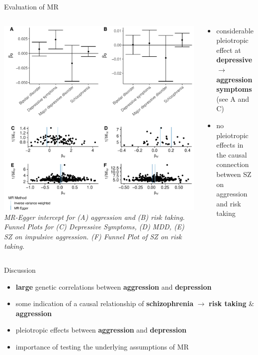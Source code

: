 \documentclass{beamer}
\begin{document}
\begin{frame}[t]{Evaluation of MR}
  \tiny
  \begin{columns}[T]
    \begin{column}[T]{0.6\textwidth}
      \includegraphics[width=0.99\linewidth]{../ukb_psychiatric/figures/sensitvity_plot.pdf}
      \vfill
      \textit{MR-Egger intercept for (A) aggression and (B) risk taking. Funnel Plots for (C) Depressive Symptoms, (D) MDD, (E) SZ on impulsive aggression. (F) Funnel Plot of SZ on risk taking.}
    \end{column}
    \begin{column}[T]{0.4\textwidth}
      \begin{itemize}
        \item considerable pleiotropic effect at \textbf{depressive $\rightarrow$ aggression symptoms} (see A and C)
        \item no pleiotropic effects in the causal connection between SZ on aggression and risk taking 
      \end{itemize}
    \end{column}
  \end{columns}
\end{frame}

\begin{frame}[t]{Discussion}
  \begin{itemize}
    \item \textbf{large} genetic correlations between \textbf{aggression} and \textbf{depression}
    \item some indication of a causal relationship of \textbf{schizophrenia} $\rightarrow$ \textbf{risk taking} \& \textbf{aggression}
    \item pleiotropic effects between \textbf{aggression} and \textbf{depression} 
    \item importance of testing the underlying assumptions of MR
  \end{itemize} 
\end{frame}
\end{document}
